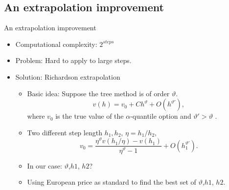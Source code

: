 \documentclass[cjk,10pt]{beamer}
\begin{document}
%

\subsection{An extrapolation improvement}

\begin{frame}{An extrapolation improvement}
\begin{itemize}
\item
Computational complexity: $2^{steps}$
\item
Problem: Hard to apply to large steps. 
\item
Solution: Richardson extrapolation
\begin{itemize}
\item
Basic idea: Suppose the tree method is of order $\vartheta$.  
\[
v(h) = v_0 + Ch^\vartheta + O(h^{\vartheta'}),
\]
where $v_0$ is the true value of the $\alpha$-quantile option and $\vartheta' > \vartheta$ .
\item
Two different step length $h_1, h_2$, $\eta = h_1/h_2$, 
\[
v_0= \frac{{\eta}^\vartheta v({h_1}/{\eta}) - v(h_1)}{{\eta}^\vartheta -1} + O(h_1^{\vartheta'}).
\]
\item
In our case: $\vartheta$,$h1$, $h2$?
\item
Using European price as standard to find the best set of {$\vartheta$,$h1$, $h2$}.
\end{itemize} 

\end{itemize}
\end{frame}
\end{document}
